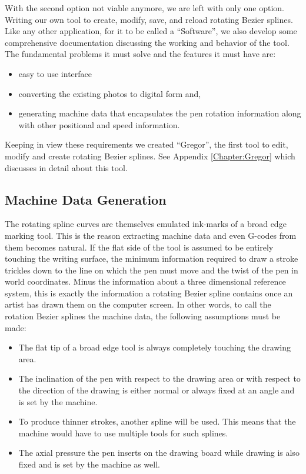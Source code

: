 With the second option not viable anymore, we are left with only one option. Writing our own tool to create, modify, save, and reload rotating Bezier splines. Like any other application, for it to be called a “Software”, we also develop some comprehensive documentation discussing the working and behavior of the tool. The fundamental problems it must solve and the features it must have are:

\begin{itemize}
\item easy to use interface
\item converting the existing photos to digital form and,
\item generating machine data that encapsulates the pen rotation information along with other positional and speed information.
\end{itemize}

Keeping in view these requirements we created ``Gregor'', the first tool to edit, modify and create rotating Bezier splines. See Appendix \ref{Chapter:Gregor} which discusses in detail about this tool.

\subsection{Machine Data Generation}
\label{ExplorationPoints1}
The rotating spline curves are themselves emulated ink-marks of a broad edge marking tool. This is the reason extracting machine data and even G-codes from them becomes natural. If the flat side of the tool is assumed to be entirely touching the writing surface, the minimum information required to draw a stroke trickles down to the line on which the pen must move and the twist of the pen in world coordinates. Minus the information about a three dimensional reference system, this is exactly the information a rotating Bezier spline contains once an artist has drawn them on the computer screen. In other words, to call the rotation Bezier splines the machine data, the following assumptions must be made:
\begin{itemize}
	\item The flat tip of a broad edge tool is always completely touching the drawing area.
	\item The inclination of the pen with respect to the drawing area or with respect to the direction of the drawing is either normal or always fixed at an angle and is set by the machine.
	\item To produce thinner strokes, another spline will be used. This means that the machine would have to use multiple tools for such splines.
	\item The axial pressure the pen inserts on the drawing board while drawing is also fixed and is set by the machine as well.
\end{itemize}

